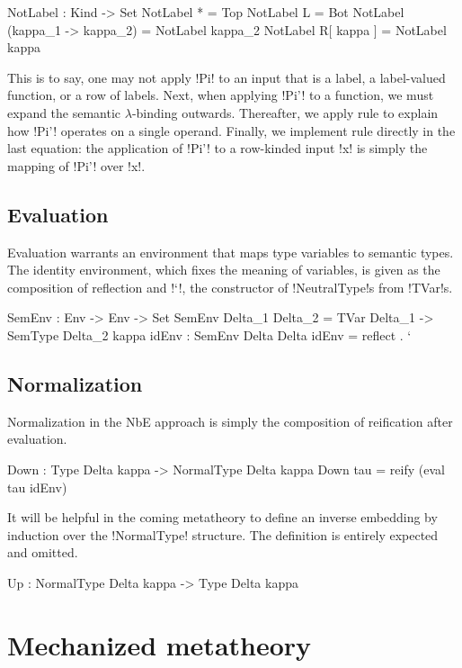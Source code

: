 \documentclass[sigplan,10pt,review]{acmart}\settopmatter{printfolios=true,printccs=false,printacmref=false}
\begin{document}
\begin{agda}
NotLabel : Kind -> Set
NotLabel * = Top
NotLabel L = Bot
NotLabel (kappa_1 -> kappa_2) = NotLabel kappa_2
NotLabel R[ kappa ] = NotLabel kappa
\end{agda}

This is to say, one may not apply !Pi! to an input that is a label, a label-valued function, or a row of labels. Next, when applying !Pi'! to a function, we must expand the semantic $\lambda$-binding outwards. Thereafter, we apply rule  to explain how !Pi'! operates on a single operand. Finally, we implement rule \errule{$\Xi$} directly in the last equation: the application of !Pi'! to a row-kinded input !x! is simply the mapping of !Pi'!  over !x!.

\subsection{Evaluation}
Evaluation warrants an environment that maps type variables to semantic types. The identity environment, which fixes the meaning of variables, is given as the composition of reflection and !`!, the constructor of !NeutralType!s from !TVar!s. 


\begin{agda}
SemEnv : Env -> Env -> Set
SemEnv Delta_1  Delta_2 = TVar Delta_1 -> SemType Delta_2 kappa 
idEnv : SemEnv Delta Delta
idEnv = reflect . `
\end{agda}

\subsection{Normalization}

Normalization in the NbE approach is simply the composition of reification after evaluation. 

\begin{agda} 
Down : Type Delta kappa -> NormalType Delta kappa
Down tau = reify (eval tau idEnv)
\end{agda}


It will be helpful in the coming metatheory to define an inverse embedding by induction over the !NormalType! structure. The definition is entirely expected and omitted. 

\begin{agda}
Up : NormalType Delta kappa -> Type Delta kappa
\end{agda}

\section{Mechanized metatheory}
\end{document}
